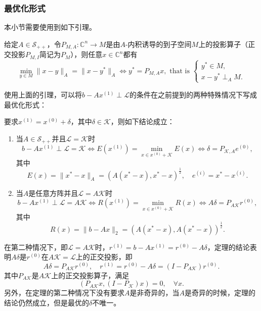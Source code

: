 \documentclass[a4paper,10pt]{ctexart}
\begin{document}
\subsubsection{最优化形式}
本小节需要使用到如下引理。
\begin{lemma}
    给定$ A\in \mathcal{S}_{++} $，令$ P_{M,A}: \mathbb{C}^n\to M $是由$ A $-内积诱导的到子空间$ M $上的投影算子（正交投影$ P_{M,I} $简记为$ P_M $），则任意$ x\in \mathbb{C}^n $都有
    \begin{equation}
        \min_{y\in M} \| x-y \|_A = \| x-y^* \|_A \iff y^* = P_{M,A}x,\text{ that is }
        \begin{cases}
            y^*\in M,\\
            x-y^*\perp_A M.
        \end{cases}
    \end{equation}
\end{lemma}
使用上面的引理，可以将$ b-Ax^{(1)}\perp \mathcal{L} $的条件在之前提到的两种特殊情况下写成最优化形式：
\begin{theorem}
    要求$ x^{(1)} = x^{(0)}+\delta $，其中$ \delta\in \mathcal{K} $，则如下结论成立：
    \begin{enumerate}
        \item 当$ A\in \mathcal{S}_{++} $并且$ \mathcal{L} = \mathcal{K} $时
        \begin{equation}
            b-Ax^{(1)}\perp \mathcal{L} = \mathcal{K} \iff E(x^{(1)}) = \min_{x\in x^{(0)}+\mathcal{K}} E(x) \iff \delta = P_{\mathcal{K},A} e^{(0)},
        \end{equation}
        其中
        \[
            E(x) = \| x^* - x \|_A = (A(x^* - x), x^* - x)^{\frac{1}{2}},\quad e^{(i)} = x^* - x^{(i)}.
        \]
        \item 当$ A $是任意方阵并且$ \mathcal{L} = A\mathcal{K} $时
        \begin{equation}
            b-Ax^{(1)}\perp \mathcal{L} = A \mathcal{K} \iff R(x^{(1)}) = \min_{x\in x^{(0)}+\mathcal{K}} R(x)\iff A \delta = P_{A\mathcal{K}} r^{(0)},
        \end{equation}
        其中
        \[
            R(x) = \| b - Ax \|_2 = (A(x^*-x), A(x^*-x))^{\frac{1}{2}}.
        \]
    \end{enumerate}
\end{theorem}
在第二种情况下，即$ \mathcal{L} = A \mathcal{K} $时，$ r^{(1)} = b-Ax^{(1)} = r^{(0)} - A \delta $，定理的结论表明$ A \delta $是$ r^{(0)} $在$ A\mathcal{K} = \mathcal{L} $上的正交投影，即
\[
    A \delta = P_{A\mathcal{K}} r^{(0)}, \quad r^{(1)} = r^{(0)} -  A \delta = (I-P_{A\mathcal{K}}) r^{(0)}.
\]
其中$ P_{A\mathcal{K}} $是$ A\mathcal{K} $上的正交投影算子，满足
\[
    (P_{A\mathcal{K}}x, (I-P_{\mathcal{K}})x) = 0,\quad \forall x.
\]
另外，在定理的第二种情况下没有要求$ A $是非奇异的，当$ A $是奇异的时候，定理的结论仍然成立，但是最优的$ \delta $不唯一。
\end{document}
